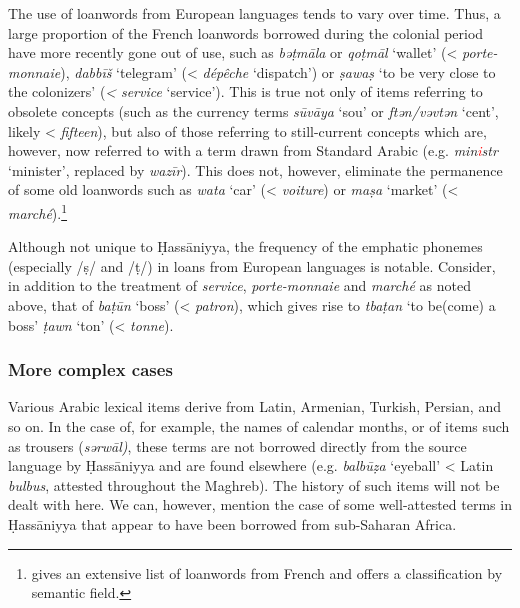 \documentclass[output=paper]{langsci/langscibook}
\begin{document}

The use of loanwords from European languages tends to vary over time. Thus, a large proportion of the French loanwords borrowed during the colonial period have more recently gone out of use, such as \textit{bə{\R}ṭmāla} or \textit{qo{\R}ṭmāl} ‘wallet’ (< \textit{porte-monnaie}), \textit{dabbīš} ‘telegram’ (< \textit{dépêche} ‘dispatch’) or \textit{ṣa{\R}waṣ} ‘to be very close to the colonizers’ (\textit{<} \textit{service} ‘service’). This is true not only of items referring to obsolete concepts (such as the currency terms \textit{sūvāya} ‘sou’ or \textit{ftən/vəvtən} ‘cent’, likely < \textit{fifteen}), but also of those referring to still-current concepts which are, however, now referred to with a term drawn from Standard Arabic (e.g. \textit{min\textcolor{red}{i}str} ‘minister’, replaced by \textit{wazīr}). This does not, however, eliminate the permanence of some old loanwords such as \textit{wata} ‘car’ (< \textit{voiture}) or \textit{ma{\R}ṣa} ‘market’ (< \textit{marché}).\footnote{\citet{OuldMohamedBaba2003} gives an extensive list of loanwords from French and offers a classification by semantic field.}

Although not unique to Ḥassāniyya, the frequency of the emphatic phonemes (especially /ṣ/ and /ṭ/) in loans from European languages is notable. Consider, in addition to the treatment of \textit{service}, \textit{porte-monnaie} and \textit{marché} as noted above, that of \textit{baṭ{\R}ūn} ‘boss’ (< \textit{patron}), which gives rise to \textit{tbaṭ{\R}an} ‘to be(come) a boss’ \textit{ṭawn} ‘ton’ (< \textit{tonne}).

\subsubsection{ More complex cases} %

 \label{wander}

Various Arabic lexical items derive from Latin, Armenian, Turkish, Persian, and so on. In the case of, for example, the names of calendar months, or of items such as trousers (\textit{sərwāl)}, these terms are not borrowed directly from the source language by Ḥassāniyya and are found elsewhere (e.g. \textit{balbūẓa} ‘eyeball’ < Latin \textit{bulbus}, attested throughout the Maghreb). The history of such items will not be dealt with here. We can, however, mention the case of some well-attested terms in Ḥassāniyya that appear to have been borrowed from sub-Saharan Africa.
\end{document}
